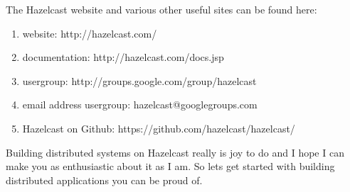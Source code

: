 The Hazelcast website and various other useful sites can be found here:
\begin{enumerate}
\item website: http://hazelcast.com/
\item documentation: http://hazelcast.com/docs.jsp
\item usergroup: http://groups.google.com/group/hazelcast
\item email address usergroup: hazelcast@googlegroups.com
\item Hazelcast on Github: https://github.com/hazelcast/hazelcast/
\end{enumerate}
Building distributed systems on Hazelcast really is joy to do and I hope I can make you as enthusiastic about it as I am. So lets get started with building distributed applications you can be proud of.
